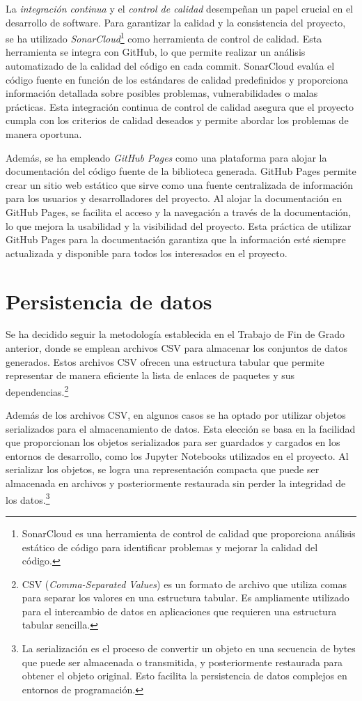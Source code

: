 La \textit{integración continua} y el \textit{control de calidad} desempeñan un papel crucial en el desarrollo de software. 
Para garantizar la calidad y la consistencia del proyecto, se ha utilizado \textit{SonarCloud}\footnote{SonarCloud es una herramienta de control de calidad que proporciona 
análisis estático de código para identificar problemas y mejorar la calidad del código.} como herramienta 
de control de calidad. Esta herramienta se integra con GitHub, lo que permite realizar un análisis 
automatizado de la calidad del código en cada commit. SonarCloud evalúa el código fuente en función 
de los estándares de calidad predefinidos y proporciona información detallada sobre posibles 
problemas, vulnerabilidades o malas prácticas. Esta integración continua de control de calidad 
asegura que el proyecto cumpla con los criterios de calidad deseados y permite abordar los 
problemas de manera oportuna.

Además, se ha empleado \textit{GitHub Pages} como una plataforma para alojar la documentación del código 
fuente de la biblioteca generada. GitHub Pages permite crear un sitio web estático que sirve 
como una fuente centralizada de información para los usuarios y desarrolladores del proyecto. 
Al alojar la documentación en GitHub Pages, se facilita el acceso y la navegación a través de 
la documentación, lo que mejora la usabilidad y la visibilidad del proyecto. Esta práctica de 
utilizar GitHub Pages para la documentación garantiza que la información esté siempre actualizada 
y disponible para todos los interesados en el proyecto.

\section{Persistencia de datos}

Se ha decidido seguir la metodología establecida en el Trabajo de Fin de Grado anterior, donde se 
emplean archivos CSV para almacenar los conjuntos de datos generados. Estos archivos CSV ofrecen una 
estructura tabular que permite representar de manera eficiente la lista de enlaces de paquetes y sus 
dependencias.\footnote{CSV (\textit{Comma-Separated Values}) es un formato de archivo que utiliza comas para 
separar los valores en una estructura tabular. Es ampliamente utilizado para el intercambio de datos 
en aplicaciones que requieren una estructura tabular sencilla.}

Además de los archivos CSV, en algunos casos se ha optado por utilizar objetos serializados para el 
almacenamiento de datos. Esta elección se basa en la facilidad que proporcionan los objetos serializados 
para ser guardados y cargados en los entornos de desarrollo, como los Jupyter Notebooks utilizados 
en el proyecto. Al serializar los objetos, se logra una representación compacta que puede ser 
almacenada en archivos y posteriormente restaurada sin perder la integridad de los 
datos.\footnote{La serialización es el proceso de convertir un objeto en una secuencia de 
bytes que puede ser almacenada o transmitida, y posteriormente restaurada para obtener el 
objeto original. Esto facilita la persistencia de datos complejos en entornos de programación.}

